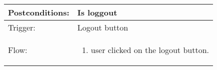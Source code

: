 \begin{longtable}{| p{3.5cm} | p{9cm} |}
\hline
Postconditions: & Is loggout\\
\hline
Trigger: & Logout button\\
\hline
Flow: &\mbox{}\par\vspace{-\baselineskip}
\begin{enumerate}
\item user clicked on the logout button.
\end{enumerate}\\
\hline
\end{longtable}
